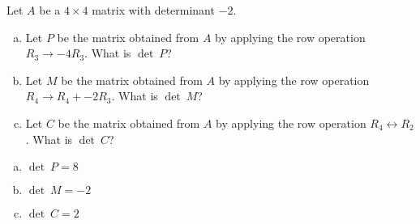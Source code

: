 
\begin{exerciseStatement}


Let \(A\) be a \(4 \times 4\) matrix with determinant \( -2 \).


\begin{enumerate}[(a)]
\item Let \(P\) be the matrix obtained from \(A\) by applying the row operation \( R_3 \to -4R_3 \). What is \(\operatorname{det}\ P\)?
\item Let \(M\) be the matrix obtained from \(A\) by applying the row operation \( R_4 \to R_4 + -2R_3 \). What is \(\operatorname{det}\ M\)?
\item Let \(C\) be the matrix obtained from \(A\) by applying the row operation \( R_4 \leftrightarrow R_2 \). What is \(\operatorname{det}\ C\)?
\end{enumerate}
    
\end{exerciseStatement}
    
\begin{exerciseAnswer} 

\begin{enumerate}[(a)]
\item \(\operatorname{det}\ P= 8 \)
\item \(\operatorname{det}\ M= -2 \)
\item \(\operatorname{det}\ C= 2 \)
\end{enumerate}
    
\end{exerciseAnswer}
    
